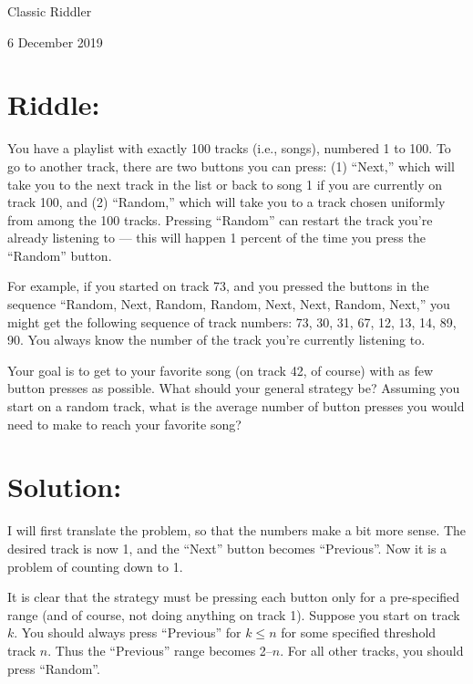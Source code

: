 \documentclass{article}
\begin{document}
\pagestyle{empty} %


\begin{center}
{\LARGE Classic Riddler}

\vspace{0.15in}

{\Large 6 December 2019}
\end{center}


\section*{Riddle:}

You have a playlist with exactly 100 tracks (i.e., songs), numbered 1 to 100.
To go to another track, there are two buttons you can press: (1) ``Next,'' which will take you to the next track in the list or back to song 1 if you are currently on track 100, and (2) ``Random,'' which will take you to a track chosen uniformly from among the 100 tracks.
Pressing ``Random'' can restart the track you’re already listening to — this will happen 1 percent of the time you press the “Random” button.

For example, if you started on track 73, and you pressed the buttons in the sequence ``Random, Next, Random, Random, Next, Next, Random, Next,'' you might get the following sequence of track numbers: 73, 30, 31, 67, 12, 13, 14, 89, 90.
You always know the number of the track you’re currently listening to.

Your goal is to get to your favorite song (on track 42, of course) with as few button presses as possible.
What should your general strategy be?
Assuming you start on a random track, what is the average number of button presses you would need to make to reach your favorite song?



\section*{Solution:}

I will first translate the problem, so that the numbers make a bit more sense.
The desired track is now 1, and the ``Next'' button becomes ``Previous''.
Now it is a problem of counting down to 1.

It is clear that the strategy must be pressing each button only for a pre-specified range (and of course, not doing anything on track 1).
Suppose you start on track $k$.
You should always press ``Previous'' for $k\leq n$ for some specified threshold track $n$.
Thus the ``Previous'' range becomes 2--$n$.
For all other tracks, you should press ``Random''.
\end{document}

